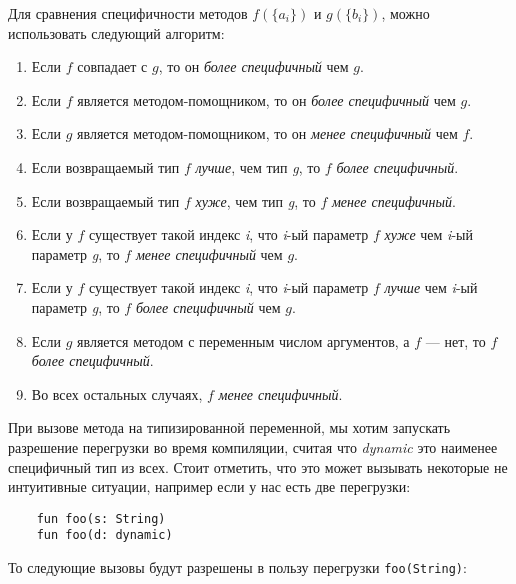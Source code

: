 
Для сравнения специфичности методов $f(\{a_i\})$ и $g(\{b_i\})$, можно использовать следующий алгоритм:

\begin{enumerate}
    \item Если $f$ совпадает с $g$, то он \textit{более специфичный} чем $g$.
    \item Если $f$ является методом-помощником, то он \textit{более специфичный} чем $g$.
    \item Если $g$ является методом-помощником, то он \textit{менее специфичный} чем $f$.
    \item Если возвращаемый тип $f$ \textit{лучше}, чем тип \textit{g}, то $f$ \textit{более специфичный}.
    \item Если возвращаемый тип $f$ \textit{хуже}, чем тип \textit{g}, то $f$ \textit{менее специфичный}.
    \item Если у $f$ существует такой индекс \textit{i}, что \textit{i}-ый параметр $f$ \textit{хуже} чем \textit{i}-ый параметр \textit{g}, то $f$ \textit{менее специфичный} чем $g$.
    \item Если у $f$ существует такой индекс \textit{i}, что \textit{i}-ый параметр $f$ \textit{лучше} чем \textit{i}-ый параметр \textit{g}, то $f$ \textit{более специфичный} чем $g$.
    \item Если $g$ является методом с переменным числом аргументов, а $f$ --- нет, то $f$ \textit{более специфичный}.
    \item Во всех остальных случаях, $f$ \textit{менее специфичный}.
\end{enumerate}

При вызове метода на типизированной переменной, мы хотим запускать разрешение перегрузки во время компиляции, считая что \textit{dynamic} это наименее специфичный тип из всех. Стоит отметить, что это может вызывать некоторые не интуитивные ситуации, например если у нас есть две перегрузки:

\begin{verbatim}
    fun foo(s: String)
    fun foo(d: dynamic)
\end{verbatim} 

То следующие вызовы будут разрешены в пользу перегрузки \texttt{foo(String)}:

